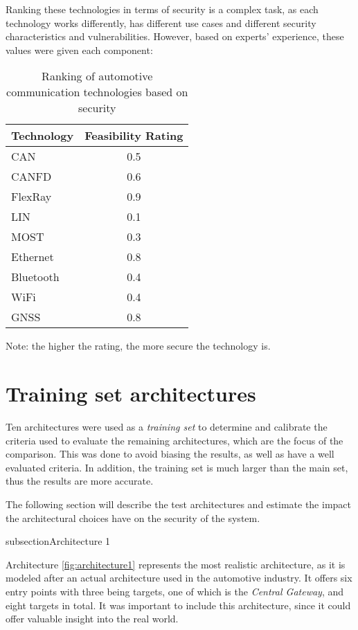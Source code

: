 Ranking these technologies in terms of security is a complex task, as each technology works differently,
has different use cases and different security characteristics and vulnerabilities.
However, based on experts' experience, these values were given each component:

\begin{table}[h]
    \centering
    \begin{tabular}{|l|c|}
    \hline
    \textbf{Technology} & \textbf{Feasibility Rating} \\
    \hline
    CAN & 0.5 \\
    CANFD & 0.6 \\
    FlexRay & 0.9 \\
    LIN & 0.1 \\
    MOST & 0.3 \\
    Ethernet & 0.8 \\
    Bluetooth & 0.4 \\
    WiFi & 0.4 \\
    GNSS & 0.8 \\
    \hline
    \end{tabular}
    \caption{Ranking of automotive communication technologies based on security}
\end{table}

Note: the higher the rating, the more secure the technology is.

\section{Training set architectures}
\label{sec:trainingarch}

Ten architectures were used as a \textit{training set} to determine and calibrate the criteria used to 
evaluate the remaining architectures, which are the focus of the comparison.
This was done to avoid biasing the results, as well as have a well evaluated criteria.
In addition, the training set is much larger than the main set, thus the results are more accurate.

The following section will describe the test architectures and estimate the impact the architectural choices have on the security of the system.

subsection{Architecture 1}
\label{subsec:arch1}

Architecture \ref{fig:architecture1} represents the most realistic architecture, 
as it is modeled after an actual architecture used in the automotive industry. 
It offers six entry points with three being targets, one of which is the \textit{Central Gateway}, and eight targets in total. 
It was important to include this architecture, since it could offer valuable insight into the real world.

